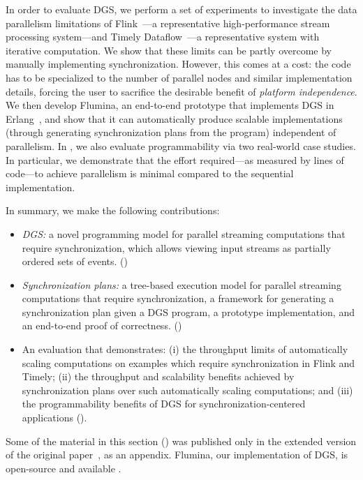 In order to evaluate DGS, we perform a set of experiments to investigate the data parallelism limitations of Flink~\cite{Flink2015}---a representative high-performance stream processing system---and
Timely Dataflow~\cite{Naiad2013}---a representative system with iterative computation.
We show that these limits can be partly overcome by manually implementing synchronization. However, this comes at a cost: the code has to be specialized
to the number of parallel nodes and similar implementation details, forcing
the user to sacrifice the desirable benefit of \emph{platform independence}.
We then develop Flumina, an end-to-end prototype that implements DGS in Erlang~\cite{armstrong1997development,virding1996concurrent}, and show that it can automatically produce scalable implementations (through generating synchronization plans from the program) independent of parallelism.
In ,
we also evaluate programmability via two real-world case studies.
In particular,
we demonstrate that the effort required---as measured by lines of code---to achieve parallelism is minimal compared to the sequential implementation.

In summary, we make the following contributions:
\begin{itemize}
\item
\emph{DGS:} a novel programming model for parallel streaming computations that require synchronization, which allows viewing input streams as partially ordered sets of events. ()
\item
\emph{Synchronization plans:} a tree-based execution model for parallel streaming computations that require synchronization, a framework for generating a synchronization plan given a DGS program, a prototype implementation, and an end-to-end proof of correctness.
()
\item
An evaluation that demonstrates: (i) the throughput limits of automatically scaling computations on examples which require synchronization in Flink and Timely; (ii) the throughput and scalability benefits achieved by synchronization plans over such automatically scaling computations; and (iii) the programmability benefits of DGS for synchronization-centered applications
().
\end{itemize}

Some of the material in this section () was published only in the extended version of the original paper~, as an appendix.
Flumina, our implementation of DGS, is open-source and available
.

